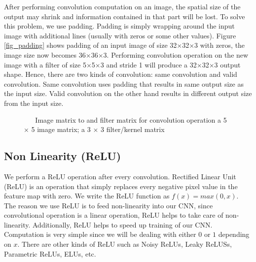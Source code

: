 \documentclass[master]{thesis-uestc}
\begin{document}
After performing convolution computation on an image, the spatial size of the output may shrink and information contained in that part will be lost. To solve this problem, we use padding. Padding is simply wrapping around the input image with additional lines (usually with zeros or some other values). Figure \ref{fig_padding} shows padding of an input image of size 32$\times$32$\times$3 with zeros, the image size now becomes 36$\times$36$\times$3. Performing convolution operation on the new image with a filter of size 5$\times$5$\times$3 and stride 1 will produce a 32$\times$32$\times$3 output shape. Hence, there are two kinds of convolution: same convolution and valid convolution. Same convolution uses padding that results in same output size as the input size. Valid convolution on the other hand results in different output size from the input size.
\begin{figure}%
\centering
{}%
\hspace{8pt}%
\caption{\,\,\,\,\,\,\,\,\,\,Image matrix to and filter matrix for convolution operation
 a 5 $\times$ 5 image matrix;
 a 3 $\times$ 3 filter/kernel matrix}
\label{fig:convolution}
\end{figure}

\subsection{Non Linearity (ReLU)}
We perform a ReLU operation after every convolution. Rectified Linear Unit (ReLU) is an operation that simply replaces every negative pixel value in the feature map with zero. We write the ReLU function as $f(x) = max(0,x)$. The reason we use ReLU is to feed non-linearity into our CNN, since convolutional operation is a linear operation, ReLU helps to take care of non-linearity. Additionally, ReLU helps to speed up training of our CNN. Computation is very simple since we will be dealing with either $0$ or $1$ depending on $x$. There are other kinds of ReLU such as Noisy ReLUs\cite{Nair:2010:RLU:3104322.3104425}, Leaky ReLUSs\cite{Maas2013RectifierNI}, Parametric ReLUs\cite{7410480}, ELUs\cite{Clevert2015FastAA}, etc.
\end{document}
